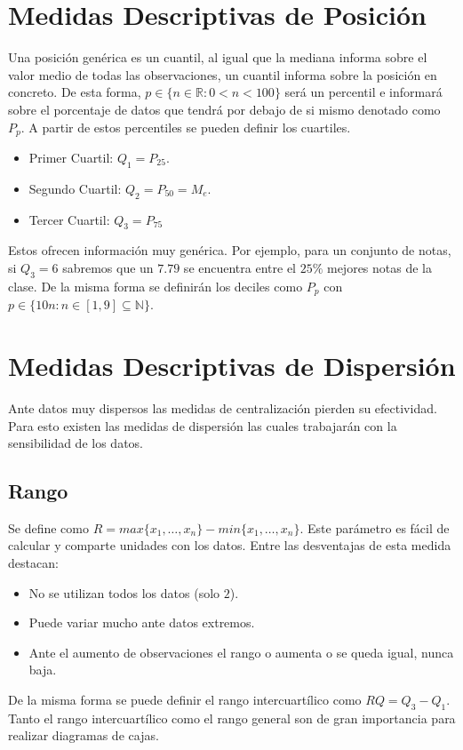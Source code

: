 \documentclass[10pt,a4paper]{book}
\begin{document}
\section{Medidas Descriptivas de Posición}
Una posición genérica es un cuantil, al igual que la mediana informa sobre el valor medio de todas las observaciones, un cuantil informa sobre la posición en concreto. De esta forma, $p\in\{n\in\mathbb{R}:0<n<100\}$ será un percentil e informará sobre el porcentaje de datos que tendrá por debajo de si mismo denotado como $P_p$. A partir de estos percentiles se pueden definir los cuartiles.
\begin{itemize}
	\item Primer Cuartil: $Q_1 = P_{25}$.
	\item Segundo Cuartil: $Q_2 = P_{50} = M_e$.
	\item Tercer Cuartil: $Q_3 = P_{75}$
\end{itemize}
Estos ofrecen información muy genérica. Por ejemplo, para un conjunto de notas, si $Q_3 =6$ sabremos que un $7.79$ se encuentra entre el $25\%$ mejores notas de la clase.
De la misma forma se definirán los deciles como $P_p$ con $p\in\{10n:n\in[1,9]\subseteq\mathbb{N}\}$.

\section{Medidas Descriptivas de Dispersión}
Ante datos muy dispersos las medidas de centralización pierden su efectividad. Para esto existen las medidas de dispersión las cuales trabajarán con la sensibilidad de los datos.
\subsection{Rango}
Se define como $R=max\{x_1,\dots,x_n\}-min\{x_1,\dots,x_n\}$. Este parámetro es fácil de calcular y comparte unidades con los datos. Entre las desventajas de esta medida destacan: 
\begin{itemize}
	\item No se utilizan todos los datos (solo $2$).
	\item Puede variar mucho ante datos extremos.
	\item Ante el aumento de observaciones el rango o aumenta o se queda igual, nunca baja.
\end{itemize}
De la misma forma se puede definir el rango intercuartílico como $RQ = Q_3-Q_1$. Tanto el rango intercuartílico como el rango general son de gran importancia para realizar diagramas de cajas.
\end{document}

